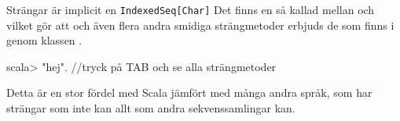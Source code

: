 \begin{Slide}{Strängar är implicit en \texttt{IndexedSeq[Char]}}\SlideFontSmall
Det finns en så kallad  mellan  och  vilket gör att  och även flera andra smidiga strängmetoder erbjuds  de som finns i \href{http://docs.oracle.com/javase/8/docs/api/java/lang/String.html}{} genom klassen \href{http://www.scala-lang.org/api/current/#scala.collection.immutable.StringOps}{}.

\vspace{0.5em}
\begin{REPLnonum}
scala> "hej".  //tryck på TAB och se alla strängmetoder
\end{REPLnonum}
Detta är en stor fördel med Scala jämfört med många andra språk, som har strängar som inte kan allt som andra sekvenssamlingar kan.
\end{Slide}


%
%
%
%




